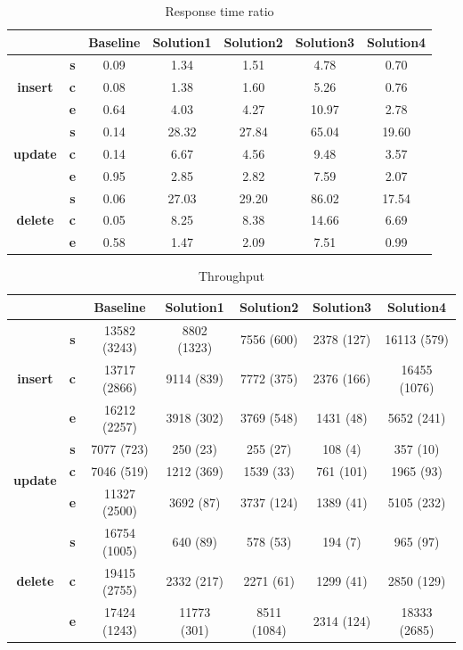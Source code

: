\begin{table}[h]
\centering
\caption{Response time ratio}\label{t:}
\begin{tabular}{ccccccc}
\toprule
&&\textbf{Baseline} & \textbf{Solution1} & \textbf{Solution2} & \textbf{Solution3} & \textbf{Solution4}\\
\midrule
\multirow{3}{*}{\textbf{insert}} & \textbf{s} & 0.09 & 1.34 & 1.51 & 4.78 & 0.70\\
 & \textbf{c} & 0.08 & 1.38 & 1.60 & 5.26 & 0.76\\
 & \textbf{e} & 0.64 & 4.03 & 4.27 & 10.97 & 2.78\\
\midrule
\multirow{3}{*}{\textbf{update}} & \textbf{s} & 0.14 & 28.32 & 27.84 & 65.04 & 19.60\\
 & \textbf{c} & 0.14 & 6.67 & 4.56 & 9.48 & 3.57\\
 & \textbf{e} & 0.95 & 2.85 & 2.82 & 7.59 & 2.07\\
\midrule
\multirow{3}{*}{\textbf{delete}} & \textbf{s} & 0.06 & 27.03 & 29.20 & 86.02 & 17.54\\
 & \textbf{c} & 0.05 & 8.25 & 8.38 & 14.66 & 6.69\\
 & \textbf{e} & 0.58 & 1.47 & 2.09 & 7.51 & 0.99\\
\bottomrule
\end{tabular}
\end{table}






\begin{table}[h]
\centering
\caption{Throughput}\label{t:}
\begin{tabular}{ccccccc}
\toprule
&&\textbf{Baseline} & \textbf{Solution1} & \textbf{Solution2} & \textbf{Solution3} & \textbf{Solution4}\\
\midrule
\multirow{3}{*}{\textbf{insert}} & \textbf{s} & 13582 (3243) & 8802 (1323) & 7556 (600) & 2378 (127) & 16113 (579)\\
 & \textbf{c} & 13717 (2866) & 9114 (839) & 7772 (375) & 2376 (166) & 16455 (1076)\\
 & \textbf{e} & 16212 (2257) & 3918 (302) & 3769 (548) & 1431 (48) & 5652 (241)\\
\midrule
\multirow{3}{*}{\textbf{update}} & \textbf{s} & 7077 (723) & 250 (23) & 255 (27) & 108 (4) & 357 (10)\\
 & \textbf{c} & 7046 (519) & 1212 (369) & 1539 (33) & 761 (101) & 1965 (93)\\
 & \textbf{e} & 11327 (2500) & 3692 (87) & 3737 (124) & 1389 (41) & 5105 (232)\\
\midrule
\multirow{3}{*}{\textbf{delete}} & \textbf{s} & 16754 (1005) & 640 (89) & 578 (53) & 194 (7) & 965 (97)\\
 & \textbf{c} & 19415 (2755) & 2332 (217) & 2271 (61) & 1299 (41) & 2850 (129)\\
 & \textbf{e} & 17424 (1243) & 11773 (301) & 8511 (1084) & 2314 (124) & 18333 (2685)\\
\bottomrule
\end{tabular}
\end{table}



